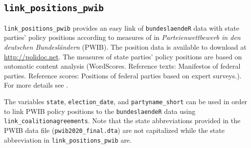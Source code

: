 \documentclass[
]{scrartcl}
\begin{document}
\newpage

\hypertarget{link_positions_pwib}{%
\subsection{\texorpdfstring{\texttt{link\_positions\_pwib}}{link\_positions\_pwib}}\label{link_positions_pwib}}

\texttt{link\_positions\_pwib} provides an easy link of
\texttt{bundeslaendeR} data with state parties' policy positions
according to measures of
\textcite{braeuningerParteienwettbewerbDeutschenBundeslaendern2020} in
\emph{Parteienwettbewerb in den deutschen Bundesländern} (PWIB). The
position data is available to download at \url{http://polidoc.net}. The
measures of state parties' policy positions are based on automatic
content analysis (WordScores. Reference texts: Manifestos of federal
parties. Reference scores: Positions of federal parties based on expert
surveys.). For more details see
\textcite[pp. 59ff.]{braeuningerParteienwettbewerbDeutschenBundeslaendern2020}.

The variables \texttt{state}, \texttt{election\_date}, and
\texttt{partyname\_short} can be used in order to link PWIB policy
positions to the \texttt{bundeslaendeR} data using
\texttt{link\_coalitionagreements}. Note that the state abbreviations
provided in the PWIB data file (\texttt{pwib2020\_final.dta}) are not
capitalized while the state abbreviation in
\texttt{link\_positions\_pwib} are.
\end{document}
